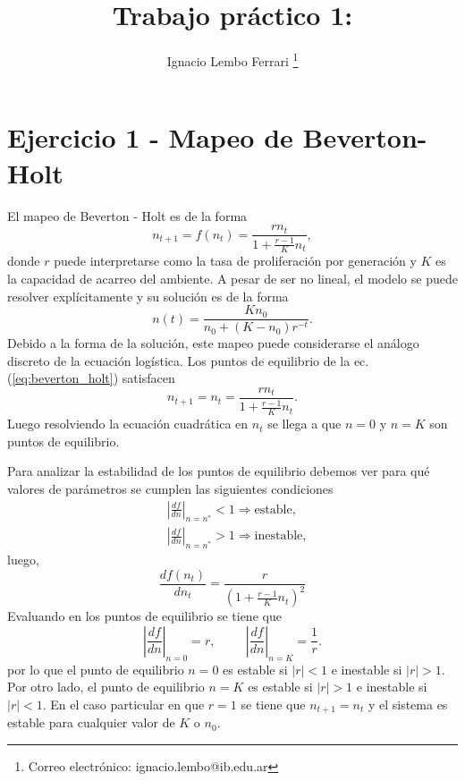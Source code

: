 \documentclass[letterpaper,12pt]{article}
\title{Trabajo práctico 1: } %
\author[1]{Ignacio Lembo Ferrari \thanks{Correo electrónico: ignacio.lembo@ib.edu.ar}}
\affil[1]{Instituto Balseiro}
\date{\vspace{-4ex}}
\theoremstyle{plain}
\begin{document}
\maketitle

\section*{Ejercicio 1 - Mapeo de Beverton-Holt}

El mapeo de Beverton - Holt es de la forma 
\begin{equation}
    n_{t+1} = f(n_t) = \frac{r n_t}{1 + \frac{r-1}{K}n_t},
    \label{eq:beverton_holt}
\end{equation}
donde $r$ puede interpretarse como la tasa de proliferación por generación y $K$ es la capacidad de acarreo del ambiente. A pesar de ser no lineal, el modelo se puede resolver explícitamente y su solución es de la forma 
\begin{equation}
    n(t) = \frac{K n_0}{n_0 + (K - n_0)r^{-t}}.
    \label{eq:beverton_sol}
\end{equation}
Debido a la forma de la solución, este mapeo puede considerarse el análogo discreto de la ecuación logística. Los puntos de equilibrio de la ec. (\ref*{eq:beverton_holt}) satisfacen 
\begin{equation}
    n_{t+1} = n_t = \frac{r n_t}{1 + \frac{r-1}{K}n_t}.    
\end{equation}
Luego resolviendo la ecuación cuadrática en $n_t$ se llega a que $n=0$ y $n = K$ son puntos de equilibrio.

Para analizar la estabilidad de los puntos de equilibrio debemos ver para qué valores de parámetros se cumplen las siguientes condiciones 
\begin{align}
    &\left| \frac{df}{dn} \right|_{n=n^*} < 1 \Rightarrow \text{estable}, \\
    &\left| \frac{df}{dn} \right|_{n=n^*} > 1 \Rightarrow \text{inestable},
\end{align} 
luego,
\begin{equation}
    \frac{d f(n_t)}{d n_t} = \frac{r}{(1 + \frac{r-1}{K}n_t)^2} 
\end{equation}
Evaluando en los puntos de equilibrio se tiene que 
\begin{equation}
    \left| \frac{df}{dn} \right|_{n=0} = r, \hspace{1cm}
    \left| \frac{df}{dn} \right|_{n=K} = \frac{1}{r}.
\end{equation}
por lo que el punto de equilibrio $n=0$ es estable si $|r|<1$ e inestable si $|r|>1$. Por otro lado, el punto de equilibrio $n=K$ es estable si $|r|>1$ e inestable si $|r|<1$. En el caso particular en que $r=1$ se tiene que $n_{t+1} = n_t$ y el sistema es estable para cualquier valor de $K$ o $n_0$.
\end{document}
